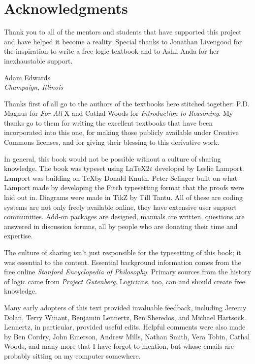 
\chapter{Acknowledgments}

Thank you to all of the mentors and students that have supported this project and have helped it become a reality. Special thanks to Jonathan Livengood for the inspiration to write a free logic textbook and to Ashli Anda for her inexhaustable support.

\begin{adjustwidth}{2em}{0em}
Adam Edwards \\
\noindent \emph{Champaign, Illinois}
\end{adjustwidth}

\pagebreak


Thanks first of all go to the authors of the textbooks here stitched together: P.D. Magnus for \emph{For All} X and Cathal Woods for \emph{Introduction to Reasoning}. My thanks go to them for writing the excellent textbooks that have been incorporated into this one, for making those publicly available under Creative Commons licenses, and for giving their blessing to this derivative work.

In general, this book would not be possible without a culture of sharing knowledge.   The book was typeset using \LaTeX$2\varepsilon$ developed by Leslie Lamport. Lamport was building on \TeX by Donald Knuth. Peter Selinger built on what Lamport made by developing the Fitch typesetting format that the proofs were laid out in. Diagrams were made in TikZ by Till Tantu. All of these are coding systems are not only freely available online, they have extensive user support communities. Add-on packages are designed, manuals are written, questions are answered in discussion forums, all by people who are donating their time and expertise.

The culture of sharing isn't just responsible for the typesetting of this book; it was essential to the content. Essential background information comes from the free online \textit{Stanford Encyclopedia of Philosophy}. Primary sources from the history of logic came from \textit{Project Gutenberg}. Logicians, too, can and should create free knowledge.

Many early adopters of this text provided invaluable feedback, including Jeremy Dolan, Terry Winant, Benjamin Lennertz, Ben Sheredos, and Michael Hartsock. Lennertz, in particular, provided useful edits. Helpful comments were also made by Ben Cordry, John Emerson, Andrew Mills, Nathan Smith, Vera Tobin, Cathal Woods, and many more that I have forgot to mention, but whose emails are probably sitting on my computer somewhere.

